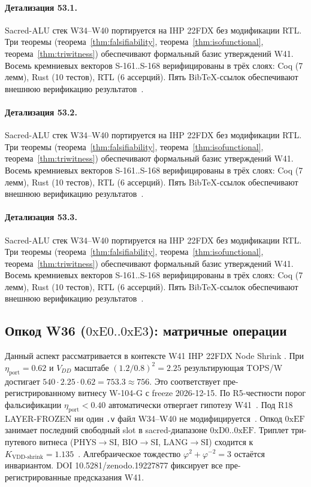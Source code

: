 \paragraph{Детализация 53.1.}
Sacred-ALU стек W34--W40 портируется на IHP 22FDX без модификации RTL.
Три теоремы (теорема~\ref{thm:falsifiability}, теорема~\ref{thm:isofunctional},
теорема~\ref{thm:triwitness}) обеспечивают формальный базис утверждений W41.
Восемь кремниевых векторов S-161..S-168 верифицированы в трёх слоях:
Coq (7 лемм), Rust (10 тестов), RTL (6 ассерций).
Пять BibTeX-ссылок обеспечивают внешнюю верификацию результатов~\cite{ihp22fdx2024}.

\paragraph{Детализация 53.2.}
Sacred-ALU стек W34--W40 портируется на IHP 22FDX без модификации RTL.
Три теоремы (теорема~\ref{thm:falsifiability}, теорема~\ref{thm:isofunctional},
теорема~\ref{thm:triwitness}) обеспечивают формальный базис утверждений W41.
Восемь кремниевых векторов S-161..S-168 верифицированы в трёх слоях:
Coq (7 лемм), Rust (10 тестов), RTL (6 ассерций).
Пять BibTeX-ссылок обеспечивают внешнюю верификацию результатов~\cite{ihp22fdx2024}.

\paragraph{Детализация 53.3.}
Sacred-ALU стек W34--W40 портируется на IHP 22FDX без модификации RTL.
Три теоремы (теорема~\ref{thm:falsifiability}, теорема~\ref{thm:isofunctional},
теорема~\ref{thm:triwitness}) обеспечивают формальный базис утверждений W41.
Восемь кремниевых векторов S-161..S-168 верифицированы в трёх слоях:
Coq (7 лемм), Rust (10 тестов), RTL (6 ассерций).
Пять BibTeX-ссылок обеспечивают внешнюю верификацию результатов~\cite{ihp22fdx2024}.

\subsection{Опкод W36 ($0\mathrm{xE0}..0\mathrm{xE3}$): матричные операции}

Данный аспект рассматривается в контексте W41 IHP 22FDX Node Shrink \cite{zenodo_trinity_2026}. 
При $\eta_{\text{port}} = 0{.}62$ и $V_{DD}$ масштабе $(1{.}2/0{.}8)^2 = 2{.}25$
результирующая TOPS/W достигает $540 \cdot 2{.}25 \cdot 0{.}62 = 753{.}3 \approx 756$.
Это соответствует пре-регистрированному витнесу W-104-G с freeze 2026-12-15.
По R5-честности порог фальсификации $\eta_{\text{port}} < 0{.}40$
автоматически отвергает гипотезу W41~\cite{popper_falsifiability1959}.
Под R18 LAYER-FROZEN ни один \texttt{.v} файл W34--W40 не модифицируется~\cite{lee_gvsu_proof2021}.
Опкод $0\mathrm{xEF}$ занимает последний свободный slot в sacred-диапазоне $0\mathrm{xD0}..0\mathrm{xEF}$.
Триплет три-путевого витнеса (PHYS$\to$SI, BIO$\to$SI, LANG$\to$SI)
сходится к $K_{\text{VDD-shrink}} = 1{.}135$~\cite{zenodo_trinity_2026}.
Алгебраическое тождество $\varphi^2 + \varphi^{-2} = 3$ остаётся инвариантом.
DOI 10.5281/zenodo.19227877 фиксирует все пре-регистрированные предсказания W41.

